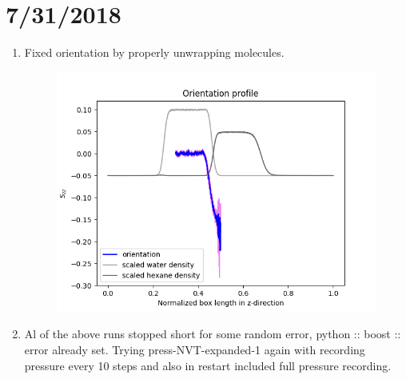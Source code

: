 \documentclass[12pt,reqno]{amsart}
\numberwithin{equation}{section}
\begin{document}
\section{7/31/2018}
\begin{enumerate}
\item Fixed orientation by properly unwrapping molecules.  
\begin{figure}[H]
\centering
\includegraphics[scale=0.6]{unwrap}
\end{figure}
\item Al of the above runs stopped short for some random error, python :: boost :: error already set.  Trying press-NVT-expanded-1 again with recording pressure every 10 steps and also in restart included full pressure recording. 
\end{enumerate}
\end{document}

